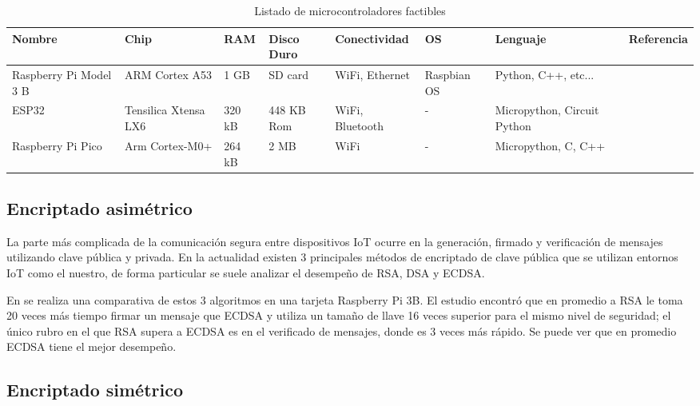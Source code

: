 \documentclass{article}
\begin{document}
            \begin{table}[htbp]
                \centering
                \begin{tabularx}{\textwidth}{ |X|X|l|X|X|X|X|X| }
                    \hline
                    Nombre & Chip & RAM & Disco Duro & Conectividad & OS & Lenguaje & Referencia \\
                    \hline
                    Raspberry Pi Model 3 B & ARM Cortex A53 & 1 GB & SD card & WiFi, Ethernet  & Raspbian OS & Python, C++, etc...  & \cite{el2018analysis}   \\
                    \hline
                    ESP32 & Tensilica Xtensa LX6 & 320 kB & 448 KB Rom & WiFi, Bluetooth & - & Micropython, Circuit Python & \cite{anand2019secure} \\
                    \hline
                    Raspberry Pi Pico & Arm Cortex-M0+ & 264 kB & 2 MB & WiFi & - & Micropython, C, C++ & \cite{pico_specs} \\
                    \hline
                \end{tabularx}
                \label{tab:controllers}
                \caption{Listado de microcontroladores factibles}
            \end{table}

        \subsection{Encriptado asimétrico}

            La parte más complicada de la comunicación segura entre dispositivos IoT ocurre en la generación, firmado y verificación de mensajes utilizando clave pública y privada. En la actualidad existen 3 principales métodos de encriptado de clave pública que se utilizan entornos IoT como el nuestro, de forma particular se suele analizar el desempeño de RSA, DSA y ECDSA.

            En \cite{el2018analysis} se realiza una comparativa de estos 3 algoritmos en una tarjeta Raspberry Pi 3B. El estudio encontró que en promedio a RSA le toma 20 veces más tiempo firmar un mensaje que ECDSA y utiliza un tamaño de llave 16 veces superior para el mismo nivel de seguridad; el único rubro en el que RSA supera a ECDSA es en el verificado de mensajes, donde es 3 veces más rápido. Se puede ver que en promedio ECDSA tiene el mejor desempeño.

        \subsection{Encriptado simétrico}
\end{document}

